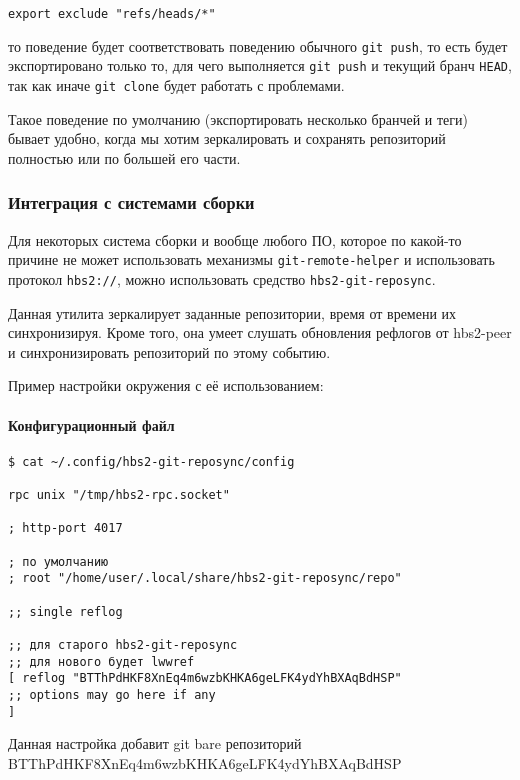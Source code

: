 \documentclass[11pt,a4paper]{article}
\begin{document}
\begin{verbatim}
export exclude "refs/heads/*"
\end{verbatim}

то поведение будет соответствовать поведению обычного \texttt{git push}, то есть будет
экспортировано только то, для чего выполняется \texttt{git push} и текущий бранч \texttt{HEAD}, так
как иначе \texttt{git clone} будет работать с проблемами.

Такое поведение по умолчанию (экспортировать несколько бранчей и теги) бывает удобно, когда мы хотим
зеркалировать и сохранять репозиторий полностью или по большей его части.

\subsubsection{Интеграция с системами сборки}

Для некоторых система сборки и вообще любого ПО, которое по какой-то причине не может использовать
механизмы \texttt{git-remote-helper} и использовать протокол \texttt{hbs2://}, можно использовать
средство \texttt{hbs2-git-reposync}.

Данная утилита зеркалирует заданные репозитории, время от времени их синхронизируя. Кроме того, она
умеет слушать обновления рефлогов от hbs2-peer и синхронизировать репозиторий по этому событию.

Пример настройки окружения с её использованием:

\paragraph{Конфигурационный файл}


\begin{verbatim}
$ cat ~/.config/hbs2-git-reposync/config

rpc unix "/tmp/hbs2-rpc.socket"

; http-port 4017

; по умолчанию
; root "/home/user/.local/share/hbs2-git-reposync/repo"

;; single reflog

;; для старого hbs2-git-reposync
;; для нового будет lwwref
[ reflog "BTThPdHKF8XnEq4m6wzbKHKA6geLFK4ydYhBXAqBdHSP"
;; options may go here if any
]

\end{verbatim}

Данная настройка добавит git bare репозиторий BTThPdHKF8XnEq4m6wzbKHKA6geLFK4ydYhBXAqBdHSP
\end{document}
